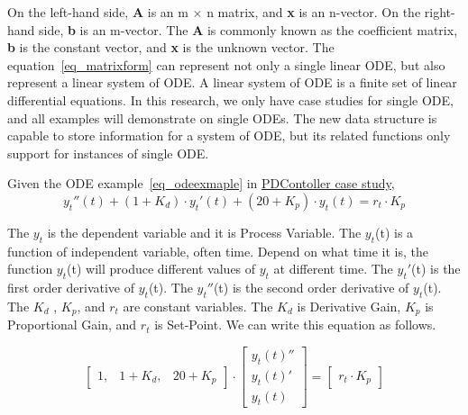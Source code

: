 On the left-hand side, \textbf{A} is an m $\times$ n matrix, and \textbf{x} is an n-vector. On the right-hand side, \textbf{b} is an m-vector. The \textbf{A} is commonly known as the coefficient matrix, \textbf{b} is the constant vector, and \textbf{x} is the unknown vector. The equation~\ref{eq_matrixform} can represent not only a single linear ODE, but also represent a linear system of ODE. A linear system of ODE is a finite set of linear differential equations. In this research, we only have case studies for single ODE, and all examples will demonstrate on single ODEs. The new data structure is capable to store information for a system of ODE, but its related functions only support for instances of single ODE.

Given the ODE example~\ref{eq_odeexmaple} in \href{https://jacquescarette.github.io/Drasil/examples/pdcontroller/SRS/srs/PDController_SRS.html}{PDContoller case study},
\begin{equation} \label{eq_odeexmaple}
	y_t''(t) + (1 + K_d) \cdot y_t'(t) + (20 + K_p) \cdot y_t(t) = r_t \cdot K_p
\end{equation}

The $y_t$ is the dependent variable and it is Process Variable. The $y_t$(t) is a function of independent variable, often time. Depend on what time it is, the function $y_t$(t) will produce different values of $y_t$ at different time. The $y_t'$(t) is the first order derivative of $y_t$(t). The $y_t''$(t) is the second order derivative of $y_t$(t). The $K_d$ , $K_p$, and $r_t$ are constant variables. The $K_d$ is Derivative Gain, $K_p$ is Proportional Gain, and $r_t$ is Set-Point. We can write this equation as follows. 

\begin{equation} \label{eq_matrixformexmaple}
	\begin{bmatrix}
		1, & 1 + K_{d}, & 20 + K_{p}
	\end{bmatrix}
	\cdot
	\begin{bmatrix}
		y_{t}(t)''  \\
		y_{t}(t)'   \\
		y_{t}(t)  
	\end{bmatrix}
	=
	\begin{bmatrix}
		r_{t} \cdot K_{p} 
	\end{bmatrix}
\end{equation}

